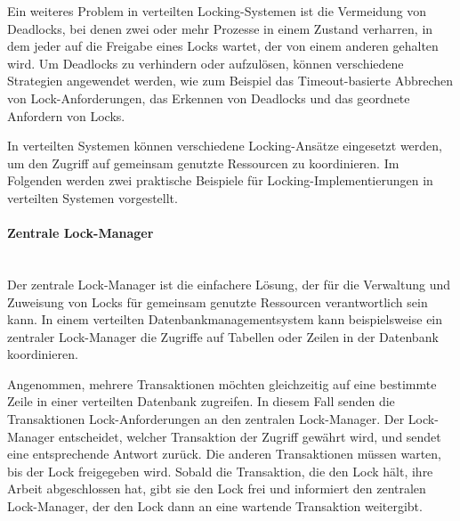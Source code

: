 \documentclass[../vs-script-first-v01.tex]{subfiles}
\begin{document}
Ein weiteres Problem in verteilten Locking-Systemen ist die Vermeidung von Deadlocks, bei denen zwei oder mehr Prozesse in einem Zustand verharren, in dem jeder auf die Freigabe eines Locks wartet, der von einem anderen gehalten wird. Um Deadlocks zu verhindern oder aufzulösen, können verschiedene Strategien angewendet werden, wie zum Beispiel das Timeout-basierte Abbrechen von Lock-Anforderungen, das Erkennen von Deadlocks und das geordnete Anfordern von Locks.

In verteilten Systemen können verschiedene Locking-Ansätze eingesetzt werden, um den Zugriff auf gemeinsam genutzte Ressourcen zu koordinieren. Im Folgenden werden zwei praktische Beispiele für Locking-Implementierungen in verteilten Systemen vorgestellt.
\paragraph{Zentrale Lock-Manager }\mbox{}\\
Der zentrale Lock-Manager ist die einfachere Lösung, der für die Verwaltung und Zuweisung von Locks für gemeinsam genutzte Ressourcen verantwortlich sein kann. In einem verteilten Datenbankmanagementsystem kann beispielsweise ein zentraler Lock-Manager die Zugriffe auf Tabellen oder Zeilen in der Datenbank koordinieren.

Angenommen, mehrere Transaktionen möchten gleichzeitig auf eine bestimmte Zeile in einer verteilten Datenbank zugreifen. In diesem Fall senden die Transaktionen Lock-Anforderungen an den zentralen Lock-Manager. Der Lock-Manager entscheidet, welcher Transaktion der Zugriff gewährt wird, und sendet eine entsprechende Antwort zurück. Die anderen Transaktionen müssen warten, bis der Lock freigegeben wird. Sobald die Transaktion, die den Lock hält, ihre Arbeit abgeschlossen hat, gibt sie den Lock frei und informiert den zentralen Lock-Manager, der den Lock dann an eine wartende Transaktion weitergibt.
\end{document}

